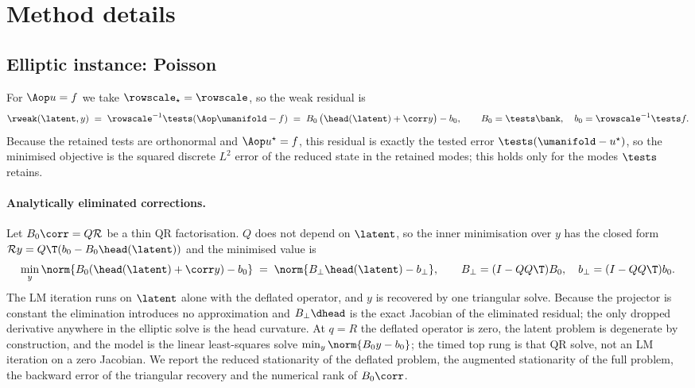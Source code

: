 
\section{Method details}
\label{app:method}

\subsection{Elliptic instance: Poisson}
\label{app:method:poisson}

For $\Aop u=f$ we take $\rowscale_\star=\rowscale$, so the weak residual is
\begin{equation}
  \rweak(\latent,y)
  \;=\;\rowscale^{-1}\tests(\Aop\umanifold-f)
  \;=\; B_0\,\big(\head(\latent)+\corr y\big) - b_0,
  \qquad
  B_0=\tests\bank,\quad b_0=\rowscale^{-1}\tests f .
  \label{eq:poisson-residual}
\end{equation}
Because the retained tests are orthonormal and $\Aop u^{\star}=f$, this residual
is exactly the tested error $\tests(\umanifold-u^{\star})$, so the minimised
objective is the squared discrete $L^2$ error of the reduced state in the
retained modes; this holds only for the modes $\tests$ retains.

\paragraph{Analytically eliminated corrections.} Let $B_0\corr=Q\mathcal{R}$ be
a thin QR factorisation. $Q$ does not depend on $\latent$, so the inner
minimisation over $y$ has the closed form
$\mathcal{R}y=Q\T(b_0-B_0\head(\latent))$ and the minimised value is
\begin{equation}
  \min_{y}\norm{B_0(\head(\latent)+\corr y)-b_0}
  \;=\;
  \norm{B_\perp \head(\latent)-b_\perp},
  \qquad
  B_\perp=(I-QQ\T)B_0,\quad b_\perp=(I-QQ\T)b_0 .
  \label{eq:varpro}
\end{equation}
The LM iteration runs on $\latent$ alone with the deflated operator, and $y$ is
recovered by one triangular solve. Because the projector is constant the
elimination introduces no approximation and $B_\perp\dhead$ is the exact
Jacobian of the eliminated residual; the only dropped derivative anywhere in
the elliptic solve is the head curvature. At $q=R$ the deflated operator is
zero, the latent problem is degenerate by construction, and the model is the
linear least-squares solve $\min_y\norm{B_0 y-b_0}$; the timed top rung is that
QR solve, not an LM iteration on a zero Jacobian. We report the reduced
stationarity of the deflated problem, the augmented stationarity of the full
problem, the backward error of the triangular recovery and the numerical rank
of $B_0\corr$.

